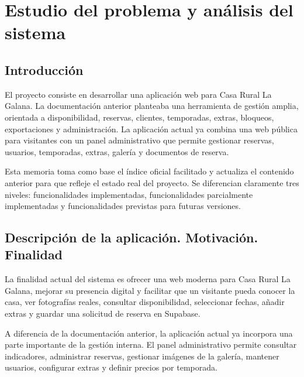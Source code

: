 \documentclass[11pt,a4paper]{article}
\begin{document}
\section{Estudio del problema y análisis del sistema}

\subsection{Introducción}
El proyecto consiste en desarrollar una aplicación web para Casa Rural La Galana. La documentación anterior planteaba una herramienta de gestión amplia, orientada a disponibilidad, reservas, clientes, temporadas, extras, bloqueos, exportaciones y administración. La aplicación actual ya combina una web pública para visitantes con un panel administrativo que permite gestionar reservas, usuarios, temporadas, extras, galería y documentos de reserva.

Esta memoria toma como base el índice oficial facilitado y actualiza el contenido anterior para que refleje el estado real del proyecto. Se diferencian claramente tres niveles: funcionalidades implementadas, funcionalidades parcialmente implementadas y funcionalidades previstas para futuras versiones.

\subsection{Descripción de la aplicación. Motivación. Finalidad}
La finalidad actual del sistema es ofrecer una web moderna para Casa Rural La Galana, mejorar su presencia digital y facilitar que un visitante pueda conocer la casa, ver fotografías reales, consultar disponibilidad, seleccionar fechas, añadir extras y guardar una solicitud de reserva en Supabase.

A diferencia de la documentación anterior, la aplicación actual ya incorpora una parte importante de la gestión interna. El panel administrativo permite consultar indicadores, administrar reservas, gestionar imágenes de la galería, mantener usuarios, configurar extras y definir precios por temporada.
\end{document}
